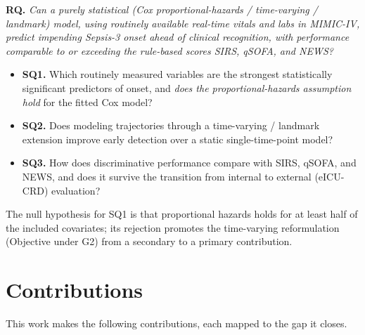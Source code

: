 \documentclass[conference]{IEEEtran}
\begin{document}
\vspace{2pt}
\noindent\textbf{RQ.} \emph{Can a purely statistical (Cox proportional-hazards
/ time-varying / landmark) model, using routinely available real-time vitals
and labs in MIMIC-IV, predict impending Sepsis-3 onset ahead of clinical
recognition, with performance comparable to or exceeding the rule-based scores
SIRS, qSOFA, and NEWS?}

\begin{itemize}
\item \textbf{SQ1.} Which routinely measured variables are the strongest
statistically significant predictors of onset, and \emph{does the
proportional-hazards assumption hold} for the fitted Cox model?
\item \textbf{SQ2.} Does modeling trajectories through a time-varying / landmark
extension improve early detection over a static single-time-point model?
\item \textbf{SQ3.} How does discriminative performance compare with SIRS,
qSOFA, and NEWS, and does it survive the transition from internal to external
(eICU-CRD) evaluation?
\end{itemize}

\noindent The null hypothesis for SQ1 is that proportional hazards holds for at
least half of the included covariates; its rejection promotes the time-varying
reformulation (Objective under G2) from a secondary to a primary contribution.

\section{Contributions}
\label{sec:contrib}
This work makes the following contributions, each mapped to the gap it closes.
\end{document}
